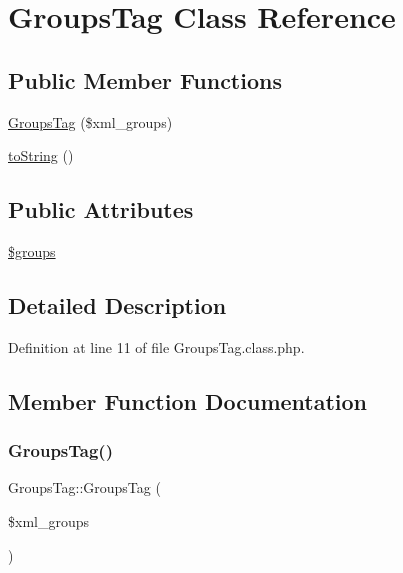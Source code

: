 \hypertarget{classGroupsTag}{}\section{Groups\+Tag Class Reference}
\label{classGroupsTag}
\subsection*{Public Member Functions}
\begin{DoxyCompactItemize}
\item 
\hyperlink{classGroupsTag_a6e715e4a1666d864895755c14ce94980}{Groups\+Tag} (\$xml\+\_\+groups)
\item 
\hyperlink{classGroupsTag_ac4937c3dbca6a6b765dad56c1a3e2bc4}{to\+String} ()
\end{DoxyCompactItemize}
\subsection*{Public Attributes}
\begin{DoxyCompactItemize}
\item 
\hyperlink{classGroupsTag_a9453af2df0470874f09d6b948c32f5c6}{\$groups}
\end{DoxyCompactItemize}


\subsection{Detailed Description}


Definition at line 11 of file Groups\+Tag.\+class.\+php.



\subsection{Member Function Documentation}
\hypertarget{classGroupsTag_a6e715e4a1666d864895755c14ce94980}{}\label{classGroupsTag_a6e715e4a1666d864895755c14ce94980} 
\subsubsection{\texorpdfstring{Groups\+Tag()}{GroupsTag()}}
{\footnotesize\ttfamily Groups\+Tag\+::\+Groups\+Tag (\begin{DoxyParamCaption}\item[{}]{\$xml\+\_\+groups }\end{DoxyParamCaption})}

